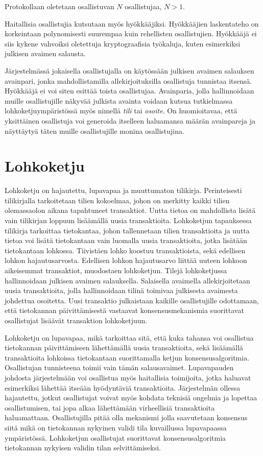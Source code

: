 Protokollaan oletetaan osallistuvan $N$ osallistujaa, $N > 1$.

Haitallisia osallistujia kutsutaan myös hyökkääjiksi. Hyökkääjien laskentateho on korkeintaan polynomisesti suurempaa kuin rehellisten osallistujien. Hyökkääjä ei siis kykene vahvoiksi oletettuja kryptograafisia työkaluja, kuten esimerkiksi julkisen avaimen salausta.

Järjestelmässä jokaisella osallistujalla on käytössään julkisen avaimen salauksen avainpari, jonka mahdollistamilla allekirjoituksilla osallistuja tunnistaa itsensä. Hyökkääjä ei voi siten esittää toista osallistujaa. Avainparia, jolla hallinnoidaan muille osallistujille näkyvää julkista avainta voidaan kutsua tutkielmassa lohkoketjuympäristössä myös nimellä \textit{tili} tai \textit{osoite}. On huomioitavaa, että yksittäinen osallistuja voi generoida itselleen haluamansa määrän avainpareja ja näyttäytyä täten muille osallistujille monina osallistujina.

\section{Lohkoketju}

Lohkoketju on hajautettu, lupavapaa ja muuttumaton tilikirja. Perinteisesti tilikirjalla tarkoitetaan tilien kokoelmaa, johon on merkitty kaikki tilien olemassaolon aikana tapahtuneet transaktiot. Uutta tietoa on mahdollista lisätä vain tilikirjan loppuun lisäämällä uusia transaktioita. Lohkoketjun tapauksessa tilikirja tarkoittaa tietokantaa, johon tallennetaan tilien transaktioita ja uutta tietoa voi lisätä tietokantaan vain luomalla uusia transaktioita, jotka lisätään tietokantaan lohkossa. Tiivistäen lohko koostuu transaktioista, sekä edellisen lohkon hajautusarvosta. Edellisen lohkon hajautusarvo liittää uuteen lohkoon aikeisemmat transaktiot, muodostaen lohkoketjun. Tilejä lohkoketjussa hallinnoidaan julkisen avaimen salauksella. Salaisella avaimella allekirjoitetaan uusia transaktioita, jolla hallinnoidaan tilinä toimivaa julkisesta avaimesta johdettua osoitetta. Uusi transaktio julkaistaan kaikille osallistujille odottamaan, että tietokannan päivittämisestä vastaavat konsensusmekanismia suorittavat osallistujat lisäävät transaktion lohkoketjuun.

Lohkoketju on lupavapaa, mikä tarkoittaa sitä, että kuka tahansa voi osallistua tietokannan päivittämiseen lähettämällä uusia transaktioita, sekä lisäämällä transaktioita lohkoissa tietokantaan suorittamalla ketjun konsensusalgoritmia. Osallistujan tunnisteena toimii vain tämän salausavaimet. Lupavapauden johdosta järjestelmään voi osallistua myös haitallisia toimijoita, jotka haluavat esimerkiksi lähettää itseään hyödyntäviä transaktioita. Järjestelmän ollessa hajautettu, jotkut osallistujat voivat myös kohdata teknisiä ongelmia ja lopettaa osallistumisen, tai jopa alkaa lähettämään virheellisiä transaktioita haluamattaan. Osallistujilla pitää olla mekanismi jolla saavutetaan konsensus siitä mikä on tietokannan nykyinen validi tila kuvaillussa lupavapaassa ympäristössä. Lohkoketjun osallistujat suorittavat konsensusalgoritmia tietokannan nykyisen validin tilan selvittämiseksi. 


